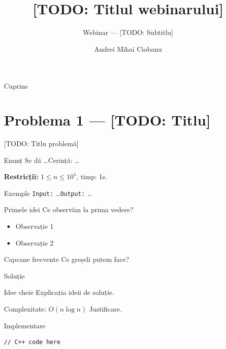 \documentclass{beamer}
\title{[TODO: Titlul webinarului]}
\subtitle{Webinar --- [TODO: Subtitlu]}
\author{Andrei Mihai Ciobanu}
\institute{Algolymp Summer School}
\date{}
\begin{document}
\begin{frame}
  \titlepage
\end{frame}

\begin{frame}{Cuprins}
  \tableofcontents[hideallsubsections]
\end{frame}

\section{Problema 1 --- [TODO: Titlu]}

\begin{frame}{[TODO: Titlu problemă]}
  \begin{exampleblock}{Enunț}
    Se dă \ldots Cerință: \ldots
    \smallskip

    \textbf{Restricții:} $1 \leq n \leq 10^5$, timp: 1s.
  \end{exampleblock}
  \begin{block}{Exemple}
    \texttt{Input:} \ldots \quad \texttt{Output:} \ldots
  \end{block}
\end{frame}

\begin{frame}{Primele idei}
  Ce observăm la prima vedere?
  \begin{itemize}
    \item Observație 1
    \item Observație 2
  \end{itemize}
  \begin{alertblock}{Capcane frecvente}
    Ce greșeli putem face?
  \end{alertblock}
\end{frame}

\begin{frame}{Soluție}
  \begin{block}{Idee cheie}
    Explicația ideii de soluție.
  \end{block}
  \begin{block}{Complexitate: $O(n \log n)$}
    Justificare.
  \end{block}
\end{frame}

\begin{frame}[fragile]{Implementare}
  \begin{lstlisting}
// C++ code here
  \end{lstlisting}
\end{frame}
\end{document}
